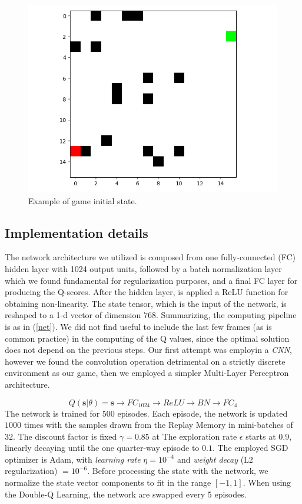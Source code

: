 \documentclass{article}
\begin{document}
\begin{figure}
	\centering
	\includegraphics[width=\textwidth]{game_example}
	\caption{Example of game initial state.}
	\label{fig:game1}
\end{figure}

\subsection{Implementation details}
The network architecture we utilized is composed from one fully-connected (FC) hidden layer with 1024 output units, followed by a batch normalization layer which we found fundamental for regularization purposes, and a final FC layer for producing the Q-scores. After the hidden layer, is applied a ReLU function for obtaining non-linearity. The state tensor, which is the input of the network, is reshaped to a 1-d vector of dimension $768$. Summarizing, the computing pipeline is as in (\ref{net}). We did not find useful to include the last few frames (as is common practice) in the computing of the Q values, since the optimal solution does not depend on the previous steps. Our first attempt was employin a \textit{CNN}, however we found the convolution operation detrimental on a strictly discrete environment as our game, then we employed a simpler Multi-Layer Perceptron architecture.

\begin{equation}
\label{net}
	Q(\textbf{s}|\theta) = \textbf{s} \rightarrow FC_{1024} \rightarrow ReLU \rightarrow BN \rightarrow FC_{4}
\end{equation}
The network is trained for $500$ episodes. Each episode, the network is updated $1000$ times with the samples drawn from the Replay Memory in mini-batches of $32$. The discount factor is fixed $\gamma=0.85$ at The exploration rate $\epsilon$ starts at $0.9$, linearly decaying until the one quarter-way episode to $0.1$. The employed SGD optimizer is Adam, with \textit{learning rate} $\eta = 10^{-4}$ and \textit{weight decay} (L2 regularization) $= 10^{-6}$.
Before processing the state with the network, we normalize the state vector components to fit in the range $[-1,1]$. When using the Double-Q Learning, the network are swapped every 5 episodes.
\end{document}

